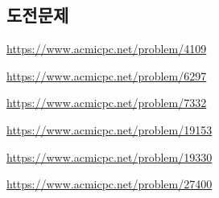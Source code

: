 \subsection{도전문제}
\begin{problem} \url{https://www.acmicpc.net/problem/4109} \end{problem}
\begin{problem} \url{https://www.acmicpc.net/problem/6297} \end{problem}
\begin{problem} \url{https://www.acmicpc.net/problem/7332} \end{problem}
\begin{problem} \url{https://www.acmicpc.net/problem/19153} \end{problem}
\begin{problem} \url{https://www.acmicpc.net/problem/19330} \end{problem}
\begin{problem} \url{https://www.acmicpc.net/problem/27400} \end{problem}